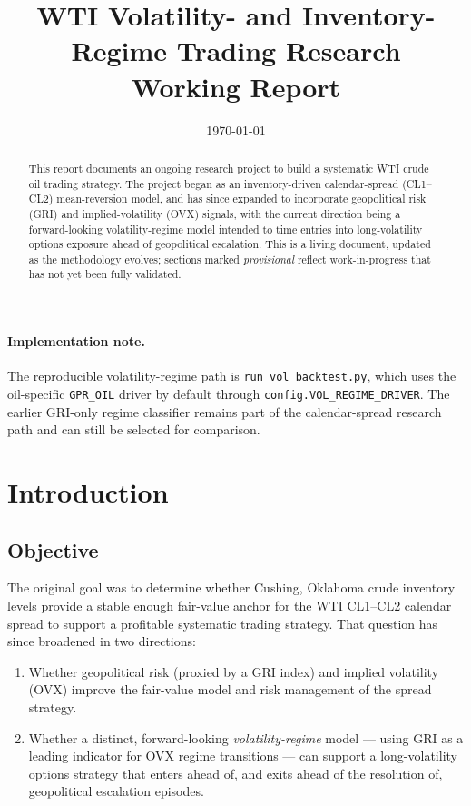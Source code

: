 \documentclass[11pt]{article}
\title{WTI Volatility- and Inventory-Regime Trading Research \\ \large Working Report}
\author{}
\date{\today}
\begin{document}
\maketitle

\begin{abstract}
This report documents an ongoing research project to build a systematic WTI
crude oil trading strategy. The project began as an inventory-driven
calendar-spread (CL1--CL2) mean-reversion model, and has since expanded to
incorporate geopolitical risk (GRI) and implied-volatility (OVX) signals,
with the current direction being a forward-looking volatility-regime model
intended to time entries into long-volatility options exposure ahead of
geopolitical escalation. This is a living document, updated as the
methodology evolves; sections marked \emph{provisional} reflect
work-in-progress that has not yet been fully validated.
\end{abstract}

\paragraph{Implementation note.}
The reproducible volatility-regime path is
\texttt{run\_vol\_backtest.py}, which uses the oil-specific
\texttt{GPR\_OIL} driver by default through
\texttt{config.VOL\_REGIME\_DRIVER}. The earlier GRI-only regime classifier
remains part of the calendar-spread research path and can still be selected
for comparison.


\tableofcontents

\section{Introduction}

\subsection{Objective}
The original goal was to determine whether Cushing, Oklahoma crude
inventory levels provide a stable enough fair-value anchor for the WTI
CL1--CL2 calendar spread to support a profitable systematic trading
strategy. That question has since broadened in two directions:

\begin{enumerate}
  \item Whether geopolitical risk (proxied by a GRI index) and implied
  volatility (OVX) improve the fair-value model and risk management of the
  spread strategy.
  \item Whether a distinct, forward-looking \emph{volatility-regime} model
  --- using GRI as a leading indicator for OVX regime transitions --- can
  support a long-volatility options strategy that enters ahead of, and
  exits ahead of the resolution of, geopolitical escalation episodes.
\end{enumerate}
\end{document}
